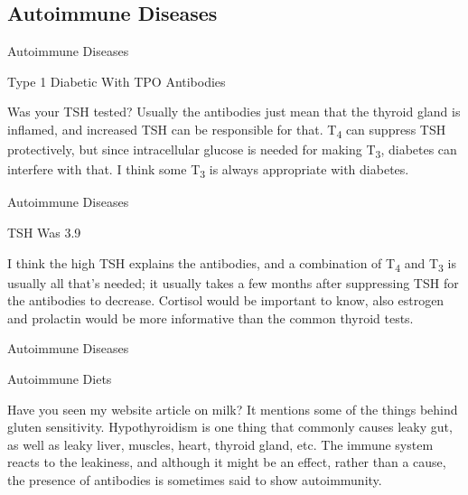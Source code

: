 \documentclass[11pt,oneside,openany,extrafontsizes]{memoir}
\begin{document}
\subsection{Autoimmune Diseases}

\begin{standalonequote}{Autoimmune Diseases}
    \begin{note}
        Type 1 Diabetic With TPO Antibodies
    \end{note}

    \begin{answer}
        Was your TSH tested? Usually the antibodies just mean that the thyroid gland is inflamed, and increased TSH can be responsible for that. T\textsubscript{4} can suppress TSH protectively, but since intracellular glucose is needed for making T\textsubscript{3}, diabetes can interfere with that. I think some T\textsubscript{3} is always appropriate with diabetes.
    \end{answer}
\end{standalonequote}

\begin{standalonequote}{Autoimmune Diseases}
    \begin{note}
        TSH Was 3.9
    \end{note}

    \begin{answer}
        I think the high TSH explains the antibodies, and a combination of T\textsubscript{4} and T\textsubscript{3} is usually all that's needed; it usually takes a few months after suppressing TSH for the antibodies to decrease. Cortisol would be important to know, also estrogen and prolactin would be more informative than the common thyroid tests.
    \end{answer}
\end{standalonequote}

\begin{standalonequote}{Autoimmune Diseases}
    \begin{note}
        Autoimmune Diets
    \end{note}

    \begin{answer}
        Have you seen my website article on milk? It mentions some of the things behind gluten sensitivity. Hypothyroidism is one thing that commonly causes leaky gut, as well as leaky liver, muscles, heart, thyroid gland, etc. The immune system reacts to the leakiness, and although it might be an effect, rather than a cause, the presence of antibodies is sometimes said to show autoimmunity.
    \end{answer}
\end{standalonequote}
\end{document}
